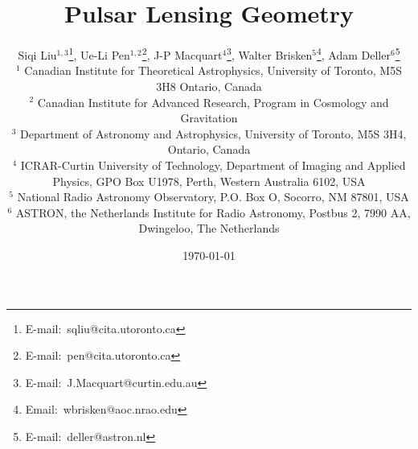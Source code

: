 \documentclass[useAMS,usenatbib]{mn2e}
\begin{document}
\title[Lensing Geometry]{
Pulsar Lensing Geometry
}

\author[Liu et al]{Siqi Liu$^{1,3}$\thanks{E-mail:\ sqliu@cita.utoronto.ca}, Ue-Li
  Pen$^{1,2}$\thanks{E-mail:\ pen@cita.utoronto.ca}, J-P Macquart$^{4}$\thanks{E-mail:\ J.Macquart@curtin.edu.au},
  Walter Brisken$^{5}$\thanks{Email:\ wbrisken@aoc.nrao.edu}, Adam Deller$^{6}$\thanks{E-mail:\ deller@astron.nl}\\
 $^1$ Canadian Institute for Theoretical Astrophysics, University of Toronto, M5S 3H8 Ontario, Canada \\
$^2$ Canadian Institute for Advanced Research, Program in Cosmology
and Gravitation\\
$^3$ Department of Astronomy and Astrophysics, University of Toronto, M5S 3H4, Ontario, Canada\\
$^4$ ICRAR-Curtin University of Technology, Department of Imaging and Applied Physics, GPO Box U1978, Perth, Western Australia 6102, USA \\
$^5$ National Radio Astronomy Observatory, P.O. Box O, Socorro, NM 87801, USA\\
$^6$ ASTRON, the Netherlands Institute for Radio Astronomy, Postbus 2, 7990 AA, Dwingeloo, The Netherlands\\
}

\date{\today}

\pagerange{\pageref{firstpage}--\pageref{lastpage}} 
\end{document}
